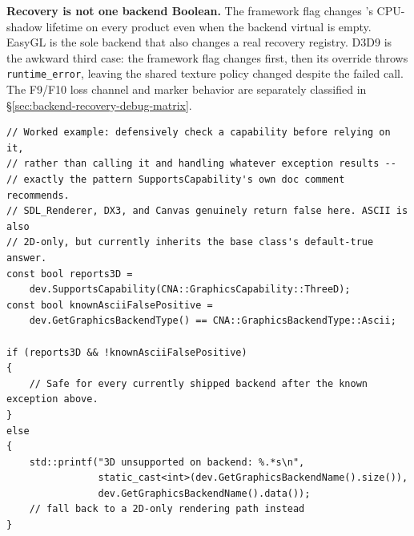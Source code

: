 \begin{sourcenote}
\textbf{Recovery is not one backend Boolean.} The framework flag changes
's CPU-shadow lifetime on every product even when the backend virtual is
empty. EasyGL is the sole backend that also changes a real recovery registry. D3D9 is the
awkward third case: the framework flag changes first, then its override throws
\texttt{runtime\_error}, leaving the shared texture policy changed despite the failed call.
The F9/F10 loss channel and marker behavior are separately classified in
\S\ref{sec:backend-recovery-debug-matrix}.
\end{sourcenote}

\begin{lstlisting}
// Worked example: defensively check a capability before relying on it,
// rather than calling it and handling whatever exception results --
// exactly the pattern SupportsCapability's own doc comment recommends.
// SDL_Renderer, DX3, and Canvas genuinely return false here. ASCII is also
// 2D-only, but currently inherits the base class's default-true answer.
const bool reports3D =
    dev.SupportsCapability(CNA::GraphicsCapability::ThreeD);
const bool knownAsciiFalsePositive =
    dev.GetGraphicsBackendType() == CNA::GraphicsBackendType::Ascii;

if (reports3D && !knownAsciiFalsePositive)
{
    // Safe for every currently shipped backend after the known exception above.
}
else
{
    std::printf("3D unsupported on backend: %.*s\n",
                static_cast<int>(dev.GetGraphicsBackendName().size()),
                dev.GetGraphicsBackendName().data());
    // fall back to a 2D-only rendering path instead
}
\end{lstlisting}

